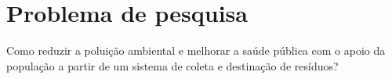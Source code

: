 \section{Problema de pesquisa}

Como reduzir a poluição ambiental e melhorar a saúde pública
com o apoio da população a partir de um sistema de coleta e destinação
de resíduos?
